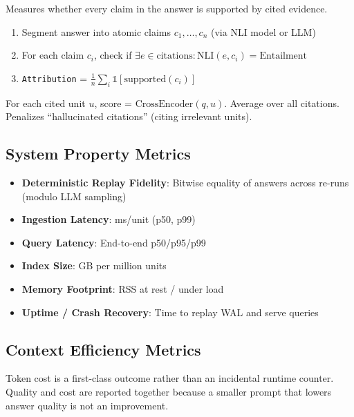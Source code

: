 \begin{definition}
\label{def:attribution}
Measures whether every claim in the answer is supported by cited evidence.
\begin{enumerate}
  \item Segment answer into atomic claims $c_1, \dots, c_n$ (via NLI model or LLM)
  \item For each claim $c_i$, check if $\exists e \in \text{citations}: \text{NLI}(e, c_i) = \text{Entailment}$
  \item \texttt{Attribution} = $\frac{1}{n} \sum_i \mathbb{1}[\text{supported}(c_i)]$
\end{enumerate}
\end{definition}

\begin{definition}
\label{def:citation-quality}
For each cited unit $u$, score = $\text{CrossEncoder}(q, u)$. Average over all citations. Penalizes ``hallucinated citations'' (citing irrelevant units).
\end{definition}

\subsection{System Property Metrics}
\label{sec:eval:system-metrics}

\begin{itemize}
  \item \textbf{Deterministic Replay Fidelity}: Bitwise equality of answers across re-runs (modulo LLM sampling)
  \item \textbf{Ingestion Latency}: ms/unit (p50, p99)
  \item \textbf{Query Latency}: End-to-end p50/p95/p99
  \item \textbf{Index Size}: GB per million units
  \item \textbf{Memory Footprint}: RSS at rest / under load
  \item \textbf{Uptime / Crash Recovery}: Time to replay WAL and serve queries
\end{itemize}

\subsection{Context Efficiency Metrics}
\label{sec:eval:context-metrics}

Token cost is a first-class outcome rather than an incidental runtime counter.
Quality and cost are reported together because a smaller prompt that lowers
answer quality is not an improvement.

